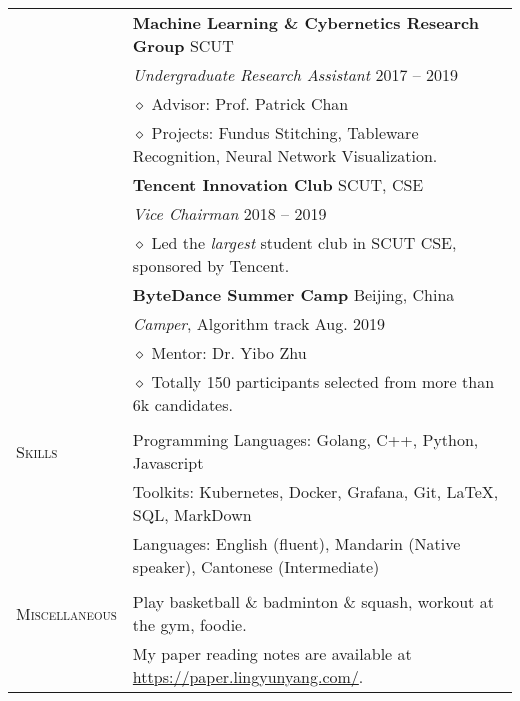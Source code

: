 \documentclass[letterpaper, 12pt]{article}
\begin{document}
\begin{longtable}{p{1.0in}p{5.8in}}
& \textbf{Machine Learning \& Cybernetics Research Group} \hfill SCUT \\
& \textit{Undergraduate Research Assistant} \hfill 2017 -- 2019 \\
& $\diamond$ Advisor: Prof. Patrick Chan \\
& $\diamond$ Projects: Fundus Stitching, Tableware Recognition, Neural Network Visualization. \\

& \textbf{Tencent Innovation Club} \hfill SCUT, CSE \\
& \textit{Vice Chairman} \hfill 2018 -- 2019 \\
& $\diamond$ Led the \textit{largest} student club in SCUT CSE, sponsored by Tencent. \\

& \textbf{ByteDance Summer Camp} \hfill Beijing, China \\
& \textit{Camper}, Algorithm track \hfill Aug. 2019 \\
& $\diamond$ Mentor: Dr. Yibo Zhu \\
& $\diamond$ Totally 150 participants selected from more than 6k candidates. \\


& \\

\nohyphens{\textsc{Skills}}
& Programming Languages: Golang, C++, Python, Javascript \\
& Toolkits: Kubernetes, Docker, Grafana, Git, \LaTeX, SQL, MarkDown \\
& Languages: English (fluent), Mandarin (Native speaker), Cantonese (Intermediate) \\
& \\


\nohyphens{\textsc{Miscellaneous}}
& Play basketball \& badminton \& squash, workout at the gym, foodie. \\
& My paper reading notes are available at \href{https://paper.lingyunyang.com/}{https://paper.lingyunyang.com/}. \\


\end{longtable}
\end{document}
